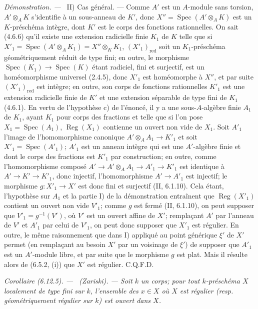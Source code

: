 \documentclass[10pt,oneside]{book}
\newcommand{\oldpage}[2][]{%
  \setcounter{footnote}{0}%
  \marginpar{\scriptsize\textbf{#1}~|~#2}\ignorespaces}
\newenvironment{corollary}[1][]{%
  \par\medskip\noindent\itshape Corollaire (#1). ---\ }{\par}
\newenvironment{proof}{%
  \par\medskip\noindent\textit{Démonstration. ---\ }}{\par}
\begin{document}
\begin{proof}
II) Cas général. --- Comme $A'$ est un $A$-module sans torsion,
$A'\otimes_AK$ s'identifie à un sous-anneau de $K'$, donc
$X''=\operatorname{Spec}(A'\otimes_AK)$ est un $K$-préschéma intègre, dont
$K'$ est le corps des fonctions rationnelles. On sait (4.6.6) qu'il existe
une extension radicielle finie $K_1$ de $K$ telle que si
$X'_1=\operatorname{Spec}(A'\otimes_AK_1)=X''\otimes_KK_1$,
$(X'_1)_{\mathrm{red}}$ soit un $K_1$-préschéma géométriquement réduit de
type fini; en outre, le morphisme $\operatorname{Spec}(K_1)\to
\operatorname{Spec}(K)$ étant radiciel, fini et surjectif, est un
homéomorphisme universel (2.4.5), donc $X'_1$ est homéomorphe à $X''$, et
par suite $(X'_1)_{\mathrm{red}}$ est intègre; en outre, son corps de
fonctions rationnelles $K'_1$ est une extension radicielle finie de $K'$ et
une extension séparable de type fini de $K_1$ (4.6.1). En vertu de
l'hypothèse c) de l'énoncé, il y a une sous-$A$-algèbre finie $A_1$ de
$K_1$, ayant $K_1$ pour corps des fractions et telle que si l'on pose
$X_1=\operatorname{Spec}(A_1)$, $\operatorname{Reg}(X_1)$ contienne un
ouvert non vide de $X_1$. Soit $A'_1$ l'image de l'homomorphisme canonique
$A'\otimes_AA_1\to K'_1$ et soit $X'_1=\operatorname{Spec}(A'_1)$; $A'_1$
est un anneau intègre qui est une $A'$-algèbre finie et dont le corps des
fractions est $K'_1$ par construction; en outre, comme l'homomorphisme
composé $A'\to A'\otimes_AA_1\to A'_1\to K'_1$ est identique à
$A'\to K'\to K'_1$, donc injectif, l'homomorphisme $A'\to A'_1$ est
injectif; le morphisme $g:X'_1\to X'$ est donc fini et surjectif
(II, 6.1.10). Cela étant, l'hypothèse sur $A_1$ et la partie I) de la
démonstration entraînent que $\operatorname{Reg}(X'_1)$
\oldpage[IV-2]{166}
contient un ouvert non vide $V'_1$; comme $g$ est fermé (II, 6.1.10), on
peut supposer que $V'_1=g^{-1}(V')$, où $V'$ est un ouvert affine de $X'$;
remplaçant $A'$ par l'anneau de $V'$ et $A'_1$ par celui de $V'_1$, on peut
donc supposer que $X'_1$ est régulier. En outre, le même raisonnement que
dans I) appliqué au point générique $\xi'$ de $X'$ permet (en remplaçant au
besoin $X'$ par un voisinage de $\xi'$) de supposer que $A'_1$ est un
$A'$-module libre, et par suite que le morphisme $g$ est plat. Mais il
résulte alors de (6.5.2, (i)) que $X'$ est régulier. C.Q.F.D.
\end{proof}

\begin{corollary}[6.12.5]
\label{IV.2.s6.12.5-fr}
\textnormal{(Zariski).} --- Soit $k$ un corps; pour tout $k$-préschéma $X$
localement de type fini sur $k$, l'ensemble des $x\in X$ où $X$ est
régulier (resp. géométriquement régulier sur $k$) est ouvert dans $X$.
\end{corollary}
\end{document}
